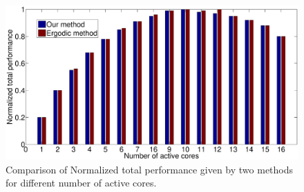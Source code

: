 \begin{figure}
\centering
\includegraphics[width=0.9\columnwidth]{fig/performance_compare.eps}
\caption{Comparison of Normalized total performance given by two methods for different number of active cores.}
\label{fig:performance_compare}
\end{figure}

